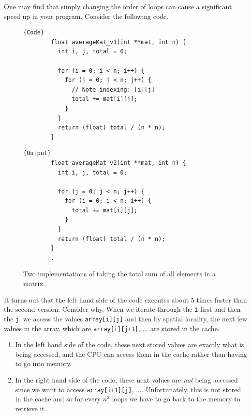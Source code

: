   \begin{example}
    \label{ex:loop-order-and-cache-locality}
    One may find that simply changing the order of loops can cause a significant speed up in your program. Consider the following code. 
    \begin{figure}[H]
      \centering 
      \noindent\begin{minipage}{.5\textwidth}
      \begin{lstlisting}[]{Code}
        float averageMat_v1(int **mat, int n) {
          int i, j, total = 0;

          for (i = 0; i < n; i++) {
            for (j = 0; j < n; j++) {
              // Note indexing: [i][j]
              total += mat[i][j];
            }
          }
          return (float) total / (n * n);
        }
      \end{lstlisting}
      \end{minipage}
      \hfill
      \begin{minipage}{.49\textwidth}
      \begin{lstlisting}[]{Output}
        float averageMat_v2(int **mat, int n) {
          int i, j, total = 0;

          for (j = 0; j < n; j++) {
            for (i = 0; i < n; i++) {
              total += mat[i][j];
            }
          }
          return (float) total / (n * n);
        }
        .
      \end{lstlisting}
      \end{minipage}
      \caption{Two implementations of taking the total sum of all elements in a matrix.} 
      \label{fig:matrix_sum}
    \end{figure}
    It turns out that the left hand side of the code executes about 5 times faster than the second version. Consider why. When we iterate through the \texttt{i} first and then the \texttt{j}, we access the values \texttt{array[i][j]} and then by spatial locality, the next few values in the array, which are \texttt{array[i][j+1]}, ... are stored in the cache. 
    \begin{enumerate}
      \item In the left hand side of the code, these next stored values are exactly what is being accessed, and the CPU can access them in the cache rather than having to go into memory. 
      \item In the right hand side of the code, these next values are \textit{not} being accessed since we want to access \texttt{array[i+1][j]}, .... Unfortunately, this is not stored in the cache and so for every $n^2$ loops we have to go back to the memory to retrieve it. 
    \end{enumerate}
  \end{example}

